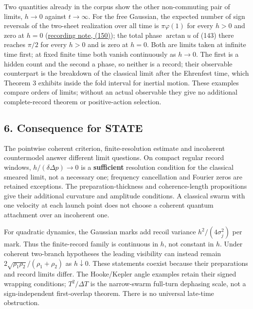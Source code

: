 \documentclass[11pt,a4paper]{article}
\begin{document}
Two quantities already in the corpus show the other non-commuting pair
of limits, \(h\to0\) against \(t\to\infty\). For the free Gaussian, the
expected number of sign reversals of the two-sheet realization over all
time is \(\pi\varphi(1)\) for every \(h>0\) and zero at \(h=0\)
(\href{score-constrained-ensemble.md\#the-gaussian-switching-specialization}{recording
note, (150)}); the total phase \(\arctan u\) of (143) there reaches
\(\pi/2\) for every \(h>0\) and is zero at \(h=0\). Both are limits
taken at infinite time first; at fixed finite time both vanish
continuously as \(h\to0\). The first is a hidden count and the second a
phase, so neither is a record; their observable counterpart is the
breakdown of the classical limit after the Ehrenfest time, which Theorem
3 exhibits inside the fold interval for inertial motion. These examples
compare orders of limits; without an actual observable they give no
additional complete-record theorem or positive-action selection.

\hypertarget{consequence-for-state}{%
\subsection{6. Consequence for STATE}\label{consequence-for-state}}

The pointwise coherent criterion, finite-resolution estimate and
incoherent countermodel answer different limit questions. On compact
regular record windows, \(h/(\delta\Delta p)\to0\) is a
\textbf{sufficient} resolution condition for the classical smeared
limit, not a necessary one; frequency cancellation and Fourier zeros are
retained exceptions. The preparation-thickness and coherence-length
propositions give their additional curvature and amplitude conditions. A
classical swarm with one velocity at each launch point does not choose a
coherent quantum attachment over an incoherent one.

For quadratic dynamics, the Gaussian marks add recoil variance
\(h^2/(4\sigma_j^2)\) per mark. Thus the finite-record family is
continuous in \(h\), not constant in \(h\). Under coherent two-branch
hypotheses the leading visibility can instead remain
\(2\sqrt{\rho_1\rho_2}/(\rho_1+\rho_2)\) as \(h\downarrow0\). These
statements coexist because their preparations and record limits differ.
The Hooke/Kepler angle examples retain their signed wrapping conditions;
\(T^2/\Delta T\) is the narrow-swarm full-turn dephasing scale, not a
sign-independent first-overlap theorem. There is no universal late-time
obstruction.
\end{document}
